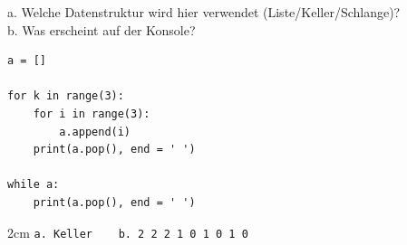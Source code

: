 \question[2]
a. Welche Datenstruktur wird hier verwendet (Liste/Keller/Schlange)? \\
b. Was erscheint auf der Konsole?
 
\begin{lstlisting}
a = []

for k in range(3):
    for i in range(3):
        a.append(i)
    print(a.pop(), end = ' ')

while a:
    print(a.pop(), end = ' ')
\end{lstlisting}

\begin{solutionbox}{2cm}
\texttt{a. Keller  ~~   b. 2 2 2 1 0 1 0 1 0} 
\end{solutionbox}

